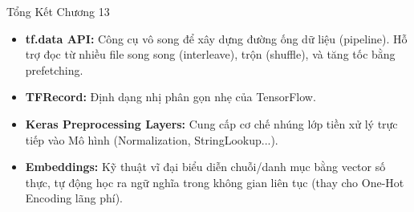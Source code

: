 \documentclass[aspectratio=169]{beamer}
\begin{document}
\begin{frame}{Tổng Kết Chương 13}
    \begin{itemize}
        \item \textbf{tf.data API:} Công cụ vô song để xây dựng đường ống dữ liệu (pipeline). Hỗ trợ đọc từ nhiều file song song (interleave), trộn (shuffle), và tăng tốc bằng prefetching.
        \item \textbf{TFRecord:} Định dạng nhị phân gọn nhẹ của TensorFlow.
        \item \textbf{Keras Preprocessing Layers:} Cung cấp cơ chế nhúng lớp tiền xử lý trực tiếp vào Mô hình (Normalization, StringLookup...).
        \item \textbf{Embeddings:} Kỹ thuật vĩ đại biểu diễn chuỗi/danh mục bằng vector số thực, tự động học ra ngữ nghĩa trong không gian liên tục (thay cho One-Hot Encoding lãng phí).
    \end{itemize}
\end{frame}
\end{document}
